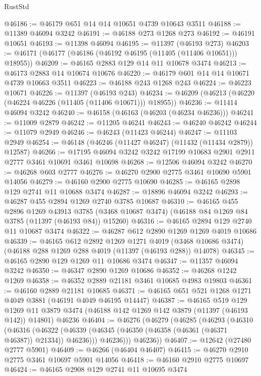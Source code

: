 \begin{lexlean}{RustStd}
\begin{coremodule}
@46186 := @46179 @651 @14 @14 @10651 @4739 @10643 @3511
@46188 := @11389 @46094 @3242
@46191 := @46188 @273 @1268 @273
@46192 := @46191 @10651
@46193 := @11398 @46094
@46195 := @11397 (@46193 @273)
@46203 := @46171 (@46177 (@46186 (@46192 @46195 (@11405 (@11406 @10651))) @18955))
@46209 := @46165 @2883 @129 @14 @11 @10678 @3474
@46213 := @46173 @2883 @14 @10674 @10676
@46220 := @46179 @601 @14 @14 @10671 @4739 @10663 @3511
@46223 := @46188 @243 @1268 @243
@46224 := @46223 @10671
@46226 := @11397 (@46193 @243)
@46234 := @46209 (@46213 (@46220 (@46224 @46226 (@11405 (@11406 @10671))) @18955))
@46236 := @11414 @46094 @3242
@46240 := @46158 (@46163 (@46203 (@46234 @46236)))
@46241 := @11009 @2879
@46242 := @11205 @46241
@46243 := @46240 @46242
@46244 := @11079 @2949
@46246 := @46243 (@11423 @46244)
@46247 := @11103 @2949
@46254 := @46148 (@46246 (@11427 @46247) (@11432 (@11434 @2879)) @12587)
@46266 := @17195 @46094 @3242 @3242 @17199 @10683 @2901 @2911 @2777 @3461 @10691 @3461 @10698
@46268 := @12506 @46094 @3242
@46270 := @46268 @603 @2777
@46276 := @46270 @2900 @2775 @3461 @10690 @5901 @14056
@46279 := @46160 @2900 @2775 @10690
@46285 := @46165 @2898 @129 @2741 @11 @10688 @3474
@46287 := @18896 @46094 @3242
@46293 := @46287 @455 @2894 @1269 @2740 @3785 @10687
@46310 := @46165
    @455
    @2896
    @1269
    @43913
    @3785
    (@3468 @10687 @3474)
    (@46188 @84 @1269 @84 @3785 (@11397 (@46193 @84)) @15260)
@46316 := @46165 @2894 @129 @2740 @11 @10687 @3474
@46322 := @46287 @612 @2890 @1269 @1269 @4019 @10686
@46339 := @46165
    @612
    @2892
    @1269
    @1271
    @4019
    (@3468 @10686 @3474)
    (@46188 @288 @1269 @288 @4019 (@11397 (@46193 @288)) @14078)
@46345 := @46165 @2890 @129 @1269 @11 @10686 @3474
@46347 := @11357 @46094 @3242
@46350 := @46347 @2890 @1269 @10686
@46352 := @46268 @1242 @1269
@46358 := @46352 @2889 @21181 @3461 @10685 @4983 @19803
@46361 := @46160 @2889 @21181 @10685
@46371 := @46165 @651 @521 @1268 @1271 @4049 @3881 (@46191 @4049 @46195 @14447)
@46387 := @46165
    @519
    @129
    @1269
    @11
    @3879
    @3474
    (@46188 @142 @1269 @142 @3879 (@11397 (@46193 @142)) @14801)
    @46236
@46404 := @46276
    (@46279
      (@46285
        (@46293
          (@46310
            (@46316
              (@46322 (@46339 (@46345 (@46350 (@46358 (@46361 (@46371 @46387)) @21334)) @46236)))
              @46236)))
        @46236))
@46407 := @12642 (@27480 @2777 @5901)
@46409 := @46266 (@46404 @46407)
@46415 := @46270 @2910 @2775 @3461 @10697 @5901 @14056
@46418 := @46160 @2910 @2775 @10697
@46424 := @46165 @2908 @129 @2741 @11 @10695 @3474

\end{coremodule}
\end{lexlean}
